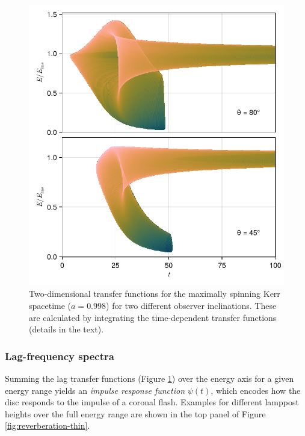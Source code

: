 \documentclass[fleqn,usenatbib]{mnras}
\begin{document}
\begin{figure}
    \centering
    \includegraphics[width=0.97\linewidth]{figures/transfer-functions.2d.pdf}
    \caption{Two-dimensional transfer functions for the maximally spinning Kerr
    spacetime ($a = 0.998$) for two different observer inclinations. These are
    calculated by integrating the time-dependent transfer functions (details in
the text).}
    \label{fig:lag-frequency-transfer-functions}
\end{figure}

\subsubsection{Lag-frequency spectra}


Summing the lag transfer functions (Figure
\ref{fig:lag-frequency-transfer-functions}) over the energy axis for a given
energy range yields an \textit{impulse response function} $\psi(t)$, which
encodes how the disc responds to the impulse of a coronal flash.
Examples for different lamppost
heights over the full energy range are shown in the top panel of Figure
\ref{fig:reverberation-thin}.
\end{document}
